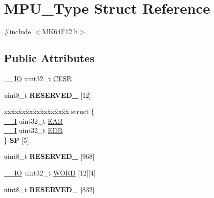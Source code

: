 \hypertarget{structMPU__Type}{}\section{M\+P\+U\+\_\+\+Type Struct Reference}
\label{structMPU__Type}


{\ttfamily \#include $<$M\+K64\+F12.\+h$>$}

\subsection*{Public Attributes}
\begin{DoxyCompactItemize}
\item 
\hyperlink{core__sc300_8h_aec43007d9998a0a0e01faede4133d6be}{\+\_\+\+\_\+\+IO} uint32\+\_\+t \hyperlink{structMPU__Type_a2e4d19626a870bb11f40ff09359fae44}{C\+E\+SR}
\item 
uint8\+\_\+t {\bfseries R\+E\+S\+E\+R\+V\+E\+D\+\_} \mbox{[}12\mbox{]}\hypertarget{structMPU__Type_a194b7be6b30b8e71bfde7c8f7f653a02}{}\label{structMPU__Type_a194b7be6b30b8e71bfde7c8f7f653a02}

\item 
\begin{tabbing}
xx\=xx\=xx\=xx\=xx\=xx\=xx\=xx\=xx\=\kill
struct \{\\
\>\hyperlink{core__sc300_8h_af63697ed9952cc71e1225efe205f6cd3}{\_\_I} uint32\_t \hyperlink{structMPU__Type_a42d8704b2a791eba1d1bc2166e755a77}{EAR}\\
\>\hyperlink{core__sc300_8h_af63697ed9952cc71e1225efe205f6cd3}{\_\_I} uint32\_t \hyperlink{structMPU__Type_a3adbf6d9dac1f29825896fa67d40a4ef}{EDR}\\
\} {\bfseries SP} \mbox{[}5\mbox{]}\hypertarget{structMPU__Type_ad75589c804f275a7bf66b297e5733b55}{}\label{structMPU__Type_ad75589c804f275a7bf66b297e5733b55}
\\

\end{tabbing}\item 
uint8\+\_\+t {\bfseries R\+E\+S\+E\+R\+V\+E\+D\+\_} \mbox{[}968\mbox{]}\hypertarget{structMPU__Type_ae772a672c918e4378b659f5630f1bc95}{}\label{structMPU__Type_ae772a672c918e4378b659f5630f1bc95}

\item 
\hyperlink{core__sc300_8h_aec43007d9998a0a0e01faede4133d6be}{\+\_\+\+\_\+\+IO} uint32\+\_\+t \hyperlink{structMPU__Type_a288c0fa35bf00f08891834e510832946}{W\+O\+RD} \mbox{[}12\mbox{]}\mbox{[}4\mbox{]}
\item 
uint8\+\_\+t {\bfseries R\+E\+S\+E\+R\+V\+E\+D\+\_} \mbox{[}832\mbox{]}\hypertarget{structMPU__Type_a55995236bd8780376b7a7368f8d742b4}{}\label{structMPU__Type_a55995236bd8780376b7a7368f8d742b4}


\end{DoxyCompactItemize}
